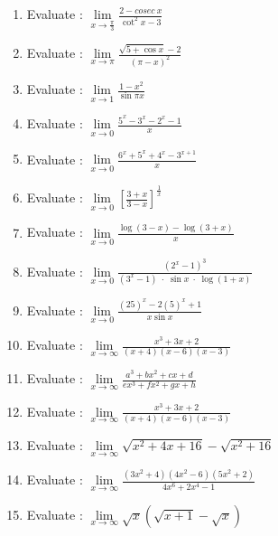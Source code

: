 \documentclass[17pt]{extarticle}
\begin{document}
\begin{multicols}{2}
\begin{enumerate}
\item Evaluate : $ \lim\limits_{ x \to \frac {\pi}{3} } \frac{ 2 -  cosec\ x }{ \cot^2 x - 3  } $
 
\item Evaluate : $ \lim\limits_{ x \to \pi } \frac{ \sqrt{ 5 + \cos x } -2 }{ ( \pi - x )^2  } $
 
\item Evaluate : $ \lim\limits_{ x \to 1 } \frac{ 1 - x^2 }{ \sin \pi x  } $
 
 
 
 \item Evaluate : $ \lim\limits_{ x \to 0 } \frac{ 5^x - 3^x - 2^x - 1 }{ x} $
 
 \item Evaluate : $ \lim\limits_{ x \to 0 } \frac{ 6^x + 5^x + 4^x - 3^{x+1} }{ x} $
 
 \item Evaluate : $ \lim\limits_{ x \to 0 } \left[ \frac{ 3+x }{3-x}\right]^{\frac{1}{x}} $
 

  \item Evaluate : $ \lim\limits_{ x \to 0 } \frac{ \log (3-x) - \log (3+x) }{ x} $
  
  
   \item Evaluate : $ \lim\limits_{ x \to 0 } \frac{ \left(2^x - 1\right)^3 }{ (3^x - 1)\; \cdot \;\sin x \; \cdot \; \log (1+x)} $
  
  
 \item Evaluate : $ \lim\limits_{ x \to 0 } \frac{ (25)^x - 2(5)^x +1}{ x\sin x} $
 \item Evaluate : $ \lim\limits_{ x \to \infty} \frac{x^3+ 3x+2}{(x+4)(x-6)(x-3)} $

 \item Evaluate : $ \lim\limits_{ x \to \infty } \frac{ a^3 + bx^2+cx +d}{ ex^3+fx^2+gx+h} $

 \item Evaluate : $ \lim\limits_{ x \to \infty} \frac{x^3+ 3x+2}{(x+4)(x-6)(x-3)} $

\item Evaluate : $ \lim\limits_{ x \to \infty } \sqrt{x^2+4x+16} - \sqrt{ x^2+16} $

\item Evaluate : $ \lim\limits_{ x \to \infty} \frac{(3x^2+4)(4x^2-6)(5x^2+2)}{4x^6+2x^4-1} $

\item Evaluate : $ \lim\limits_{ x \to \infty }\sqrt{x}\left( \sqrt{x+1} - \sqrt{x}\right) $

\end{enumerate} 


\end{multicols}
 
\end{document}
